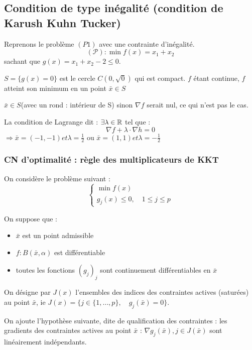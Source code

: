\subsection{Condition de type inégalité (condition de Karush Kuhn Tucker)}

\begin{exemple}
	Reprenons le problème $(P1)$ avec une contrainte d'inégalité.
	\[ (\mathcal{P}) : \min f(x) = x_1 + x_2 \]
	sachant que $g(x) = x_1+x_2 -2 \leq 0$.
	
	$S = \{ g(x) = 0 \}$ est le cercle $C(0, \sqrt{0})$ qui est compact. $f$ étant continue, $f$ atteint son minimum en un point $\bar{x} \in S$
	
	$\bar{x} \in S$(avec un rond : intérieur de S) sinon $\nabla f$ serait nul, ce qui n'est pas le cas.
	
	La condition de Lagrange dit : $\exists \lambda \in \mathbb{R}$ tel que : \[ \nabla f + \lambda \cdot \nabla h = 0 \]
	$\Rightarrow \bar{x} = (-1, -1) et \lambda = \frac{1}{2}$ ou $\bar{x} = (1, 1) et \lambda = -\frac{1}{2}$
	
\end{exemple}
	
	\subsubsection{CN d'optimalité : règle des multiplicateurs de KKT}
	
	On considère le problème suivant : \[ \begin{cases}\min f(x) \\ g_j(x) \leq 0 , \quad 1 \leq j \leq p \end{cases} \]
	
	On suppose que :
\begin{itemize}
	\item $\bar{x}$ est un point admissible
	\item $f:B(\bar{x},\alpha)$ est différentiable
	\item toutes les fonctions $(g_j)_j$ sont continuement différentiables en $\bar{x}$
\end{itemize}

On désigne par $J(x)$ l'ensembles des indices des contraintes actives (saturées) au point $\bar{x}$, ie $J(x) = \{ j \in \{ 1, \dots, p \}, \quad g_j(\bar{x}) = 0 \} $.

On ajoute l'hypothèse suivante, dite de qualification des contraintes : les gradients des contraintes actives au point $\bar{x}$ : $\nabla g_j(\bar{x}), {j\in J(\bar{x})}$ sont linéairement indépendants.

